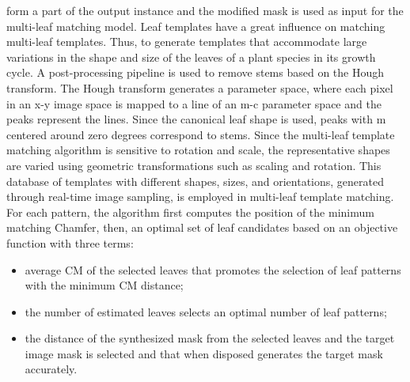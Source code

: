 form a part of the output instance and the modified mask is used as input for the multi-leaf matching model.
Leaf templates have a great influence on matching multi-leaf templates. Thus, to generate templates that accommodate large variations in
the shape and size of the leaves of a plant species in its growth cycle. A post-processing pipeline is used to remove stems based on the Hough
transform. The Hough transform generates a parameter space, where each pixel in an x-y image space is mapped to a line of an m-c parameter space
and the peaks represent the lines. Since the canonical leaf shape is used, peaks with m centered around zero degrees correspond to stems. Since
the multi-leaf template matching algorithm is sensitive to rotation and scale, the representative shapes are varied using geometric transformations
such as scaling and rotation. This database of templates with different shapes, sizes, and orientations, generated through real-time image sampling,
is employed in multi-leaf template matching. For each pattern, the algorithm first computes the position of the minimum matching Chamfer, then, an
optimal set of leaf candidates based on an objective function with three terms: 
\begin{itemize}
    \item average CM of the selected leaves that promotes the selection of leaf patterns with the minimum CM distance;
    \item the number of estimated leaves selects an optimal number of leaf patterns; 
    \item the distance of the synthesized mask from the selected leaves and the target image mask is selected and that when disposed generates the target mask accurately.
\end{itemize}

